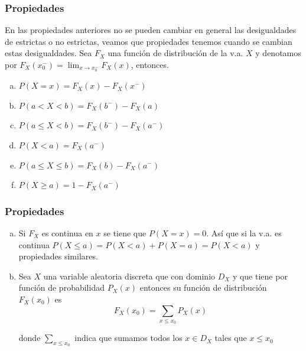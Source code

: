 \documentclass[handout]{beamer}\usepackage[]{graphicx}\usepackage[]{color}
\renewcommand{\leq}{\leqslant}
\renewcommand{\geq}{\geqslant}
\theoremstyle{plain}
\newtheorem{prop}{Propiedades}
\theoremstyle{definition}
\begin{document}
\begin{frame}

\frametitle{Propiedades}

En las propiedades anteriores no se pueden cambiar en general las desigualdades de
estrictas o no estrictas, veamos que propiedades tenemos cuando se cambian estas
desigualdades.
           Sea $F_{X}$ una función de distribución de la v.a. $X$ y denotamos
           por $F_{X}(x_{0}^{-})=\displaystyle \lim_{x\to x_{0}^{-}} F_{X}(x)$, entonces.
           \begin{enumerate}[a)]
           \item $P(X=x)=F_{X}(x)-F_{X}(x^{-})$
           \item $P(a< X< b)=F_{X}(b^{-})-F_{X}(a)$
           \item $P(a\leq X< b)=F_{X}(b^{-})-F_{X}(a^{-})$
           \item $P(X<a)=F_{X}(a^{-})$
           \item $P(a\leq X\leq b)=F_{X}(b)-F_{X}(a^{-})$
           \item $P(X\geq a)=1-F_{X}(a^{-})$
        \end{enumerate}
\end{frame}


\begin{frame}

\frametitle{Propiedades}
\begin{enumerate}[a)]
\item Si  $F_X$ es continua en $x$ se tiene que $P(X=x)=0$.
Así que si la v.a. es continua $P(X\leq a)=P(X< a)+P(X=a)=P(X<a)$ y propiedades similares.
\item  Sea $X$ una variable aleatoria discreta que con dominio $D_X$ y
que tiene por función de probabilidad $P_{X}(x)$ entonces su función de distribución
$F_{X}(x_0)$ es
$$F_{X}(x_0)=\sum_{x\leq x_{0}} P_{X}(x)$$

donde $\sum_{x\leq x_{0}}$ indica que sumamos todos los $x \in D_X$ tales que $x\leq
x_{0}$
\end{enumerate}
\end{frame}
\end{document}

